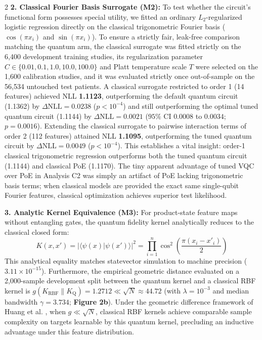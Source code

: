 \documentclass[10pt,a4paper,twoside]{article}
\begin{document}
\begin{multicols}{2}
\textbf{2. Classical Fourier Basis Surrogate (M2):} To test whether the circuit's functional form possesses special utility, we fitted an ordinary $L_2$-regularized logistic regression directly on the classical trigonometric Fourier basis ($\cos(\pi x_i)$ and $\sin(\pi x_i)$). To ensure a strictly fair, leak-free comparison matching the quantum arm, the classical surrogate was fitted strictly on the 6,400 development training studies, its regularization parameter $C \in \{0.01, 0.1, 1.0, 10.0, 100.0\}$ and Platt temperature scale $T$ were selected on the 1,600 calibration studies, and it was evaluated strictly once out-of-sample on the 56,534 untouched test patients. A classical surrogate restricted to order 1 (14 features) achieved NLL \textbf{1.1123}, outperforming the default quantum circuit (1.1362) by $\Delta\text{NLL} = 0.0238$ ($p < 10^{-4}$) and still outperforming the optimal tuned quantum circuit (1.1144) by $\Delta\text{NLL} = \mathbf{0.0021}$ ($95\%$ CI $0.0008$ to $0.0034$; $p = 0.0016$). Extending the classical surrogate to pairwise interaction terms of order 2 (112 features) attained NLL \textbf{1.1095}, outperforming the tuned quantum circuit by $\Delta\text{NLL} = 0.0049$ ($p < 10^{-4}$). This establishes a vital insight: order-1 classical trigonometric regression outperforms both the tuned quantum circuit (1.1144) and classical PoE (1.1170). The tiny apparent advantage of tuned VQC over PoE in Analysis C2 was simply an artifact of PoE lacking trigonometric basis terms; when classical models are provided the exact same single-qubit Fourier features, classical optimization achieves superior test likelihood.

\textbf{3. Analytic Kernel Equivalence (M3):} For product-state feature maps without entangling gates, the quantum fidelity kernel analytically reduces to the classical closed form:
\begin{equation}
K(x, x') = |\langle \psi(x) | \psi(x') \rangle|^2 = \prod_{i=1}^n \cos^2\left(\frac{\pi(x_i - x'_i)}{2}\right)
\end{equation}
This analytical equality matches statevector simulation to machine precision ($3.11 \times 10^{-15}$). Furthermore, the empirical geometric distance \cite{huang2021power} evaluated on a 2,000-sample development split between the quantum kernel and a classical RBF kernel is $g(K_{\text{RBF}} \parallel K_{\text{Q}}) = 1.2712 \ll \sqrt{N} \approx 44.72$ (with $\lambda = 10^{-3}$ and median bandwidth $\gamma = 3.734$; \textbf{Figure 2b}). Under the geometric difference framework of Huang et al. \cite{huang2021power}, when $g \ll \sqrt{N}$, classical RBF kernels achieve comparable sample complexity on targets learnable by this quantum kernel, precluding an inductive advantage under this feature distribution.


\end{multicols}
\end{document}
